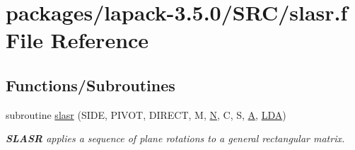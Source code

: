 \hypertarget{slasr_8f}{}\section{packages/lapack-\/3.5.0/\+S\+R\+C/slasr.f File Reference}
\label{slasr_8f}
\subsection*{Functions/\+Subroutines}
\begin{DoxyCompactItemize}
\item 
subroutine \hyperlink{group__auxOTHERauxiliary_ga60f6d566e3a36c43835b0ff3055879dc}{slasr} (S\+I\+D\+E, P\+I\+V\+O\+T, D\+I\+R\+E\+C\+T, M, \hyperlink{polmisc_8c_a0240ac851181b84ac374872dc5434ee4}{N}, C, S, \hyperlink{classA}{A}, \hyperlink{example__user_8c_ae946da542ce0db94dced19b2ecefd1aa}{L\+D\+A})
\begin{DoxyCompactList}\small\item\em {\bfseries S\+L\+A\+S\+R} applies a sequence of plane rotations to a general rectangular matrix. \end{DoxyCompactList}\end{DoxyCompactItemize}
